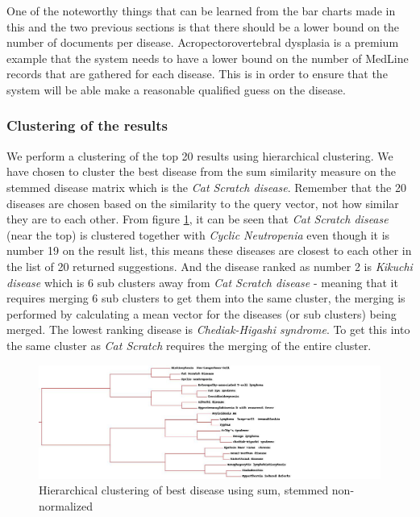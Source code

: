 One of the noteworthy things that can be learned from the bar charts made in this and 
the two previous sections is that there should be a lower bound on the number of documents 
per disease. Acropectorovertebral dysplasia is a premium example that the system needs to 
have a lower bound on the number of MedLine records that are gathered for each disease. 
This is in order to ensure that the system will be able make a reasonable qualified guess 
on the disease.

\subsubsection{Clustering of the results}

We perform a clustering of the top 20 results using hierarchical
clustering. We have chosen to cluster the best disease from the sum
similarity measure on the stemmed disease matrix which is the
\textit{Cat Scratch disease}. Remember that the 20 diseases are chosen
based on the similarity to the query vector, not how similar they are
to each other. From figure
\ref{sum_stem_top20_best_cat_scratch_disease}, it can be seen that
\textit{Cat Scratch disease} (near the top) is clustered together with
\textit{Cyclic Neutropenia} even though it is number 19 on the result
list, this means these diseases are closest to each other in the list
of 20 returned suggestions. And the disease ranked as number 2 is
\textit{Kikuchi disease} which is 6 sub clusters away from \textit{Cat
  Scratch disease} - meaning that it requires merging 6 sub clusters
to get them into the same cluster, the merging is performed by
calculating a mean vector for the diseases (or sub clusters) being
merged. The lowest ranking disease is \textit{Chediak-Higashi
  syndrome}. To get this into the same cluster as \textit{Cat Scratch}
requires the merging of the entire cluster.

\begin{figure}[H]
  \begin{center}
    \includegraphics[width=1.3\textwidth]{clusters/sum_stem_top20_best_cat_scratch_disease.jpg}
  \end{center}
  \caption{Hierarchical clustering of best disease using sum, stemmed non-normalized}
  \label{sum_stem_top20_best_cat_scratch_disease}
\end{figure}

